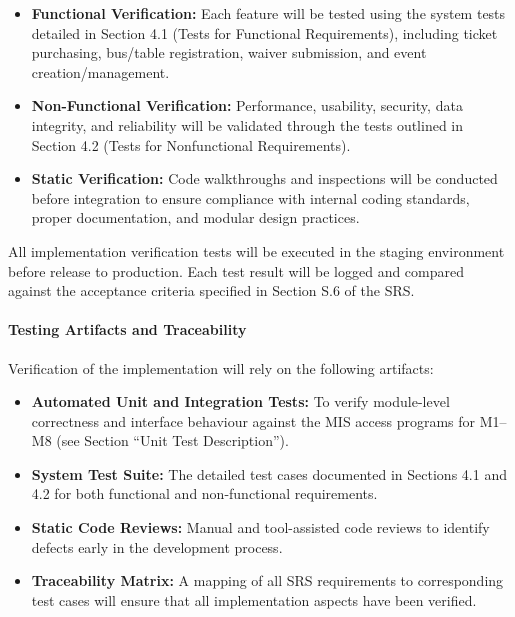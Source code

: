 \documentclass[12pt, titlepage]{article}
\begin{document}
\begin{itemize}
    \item \textbf{Functional Verification:} Each feature will be tested using the system tests detailed in Section 4.1 (Tests for Functional Requirements), including ticket purchasing, bus/table registration, waiver submission, and event creation/management.
    \item \textbf{Non-Functional Verification:} Performance, usability, security, data integrity, and reliability will be validated through the tests outlined in Section 4.2 (Tests for Nonfunctional Requirements).
    \item \textbf{Static Verification:} Code walkthroughs and inspections will be conducted before integration to ensure compliance with internal coding standards, proper documentation, and modular design practices.
\end{itemize}

\noindent All implementation verification tests will be executed in the staging environment before release to production. Each test result will be logged and compared against the acceptance criteria specified in Section S.6 of the SRS.

\paragraph{Testing Artifacts and Traceability}
\noindent \newline
Verification of the implementation will rely on the following artifacts:
\begin{itemize}
    \item \textbf{Automated Unit and Integration Tests:} To verify module-level correctness and interface behaviour against the MIS access programs for M1--M8 (see Section ``Unit Test Description'').
    \item \textbf{System Test Suite:} The detailed test cases documented in Sections 4.1 and 4.2 for both functional and non-functional requirements.
    \item \textbf{Static Code Reviews:} Manual and tool-assisted code reviews to identify defects early in the development process.
    \item \textbf{Traceability Matrix:} A mapping of all SRS requirements to corresponding test cases will ensure that all implementation aspects have been verified.
\end{itemize}
\end{document}
